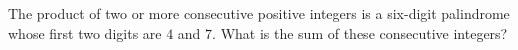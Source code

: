 The product of two or more consecutive positive integers is a six-digit palindrome whose first two digits are $4$ and $7$. What is the sum of these consecutive integers?
